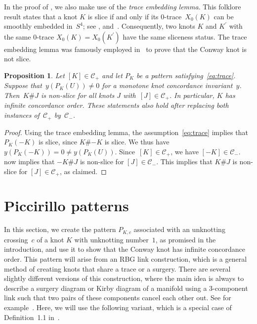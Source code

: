 \documentclass{amsart}
\newcommand{\CC}{\mathcal{C}}
\newcommand{\pr}{^{\prime}}
\newtheorem{prop}[theorem]{Proposition}
\theoremstyle{remark}
\begin{document}
In the proof of , we also make use of the \emph{trace embedding lemma}. This folklore result states that a knot $K$ is slice if and only if its $0$-trace~$X_0(K)$ can be smoothly embedded in~$S^4$; see \cite[Lemma~1.3]{piccirillo:Conway}, \cite[Theorem~1.8]{miller-piccirillo} and~\cite{kirby-melvin}. Consequently, two knots $K$ and $K\pr$ with the same $0$-trace $X_0(K) = X_0(K\pr)$ have the same sliceness status. The trace embedding lemma was famously employed in~\cite{piccirillo:Conway} to prove that the Conway knot is not slice. 

\begin{prop}\label{cor:inf_order_pattern}
Let $[K]\in \CC_+$ and let $P_K$ be a pattern satisfying~\eqref{eq:trace}. Suppose that~$y(P_K(U)) \neq 0$ for a monotone knot concordance invariant~$y$. Then~$K \# J$ is non-slice for all knots $J$ with~$[J]\in \CC_{+}$. In particular, $K$ has infinite concordance order. These statements also hold after replacing both instances of~$\CC_+$ by~$\CC_-$. 
\end{prop}

\begin{proof}
Using the trace embedding lemma, the assumption~\eqref{eq:trace} implies that~$P_K(-K)$ is slice, since $K \# {-K}$ is slice. We thus have $y(P_K(-K)) = 0 \neq y(P_K(U))$. Since~$[K]\in \CC_+$, we have $[-K]\in \CC_-$.  now implies that $-K \# J$ is non-slice for $[J]\in \CC_{-}$. This implies that $K\# J$ is non-slice for $[J]\in \CC_{+}$, as claimed.
\end{proof}

\section{Piccirillo patterns}\label{sec:picc_patterns}

In this section, we create the pattern $P_{K,c}$ associated with an unknotting crossing~$c$ of a knot $K$ with unknotting number~$1$, as promised 
in the introduction, and use it to show that the Conway knot has infinite concordance order. This pattern will arise from an RBG link construction, which is a general method of creating knots that share a trace or a surgery. There are several slightly different versions of this construction, where the main idea is always to describe a surgery diagram or Kirby diagram of a manifold using a $3$-component link such that two pairs of these components cancel each other out. See for example~\cite{Akbulut,BM_non_char,piccirillo:shake-genus,piccirillo:Conway,manolescu-piccirillo:RBG,Tagami,qin,KP_four_surgeries,RBG_high_dim,HPW}. Here, we will use the following variant, which is a special case of Definition~1.1 in~\cite{manolescu-piccirillo:RBG}.
\end{document}
